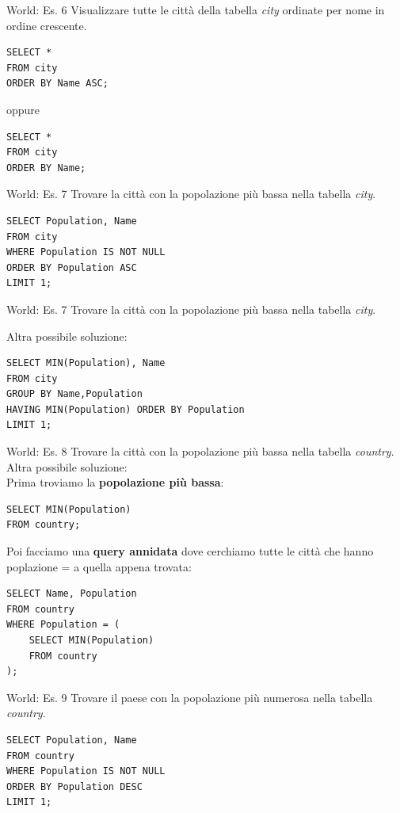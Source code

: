 %
\begin{frame}[fragile]{World: Es. 6}
Visualizzare tutte le citt\`a della tabella \textit{city} ordinate per nome in ordine crescente.
\pause
\begin{lstlisting}
SELECT *
FROM city
ORDER BY Name ASC;
\end{lstlisting}
oppure
\pause
\begin{lstlisting}
SELECT *
FROM city
ORDER BY Name;
\end{lstlisting}
\end{frame}
%
\begin{frame}[fragile]{World: Es. 7}
Trovare la citt\`a con la popolazione pi\`u bassa nella tabella \textit{city}.
\pause
\vspace{-.1cm}
\begin{lstlisting}
SELECT Population, Name
FROM city
WHERE Population IS NOT NULL
ORDER BY Population ASC
LIMIT 1;
\end{lstlisting}
\end{frame}
%
\begin{frame}[fragile]{World: Es. 7}
Trovare la citt\`a con la popolazione pi\`u bassa nella tabella \textit{city}.

Altra possibile soluzione:
\vspace{-.1cm}
\begin{lstlisting}
SELECT MIN(Population), Name
FROM city
GROUP BY Name,Population
HAVING MIN(Population) ORDER BY Population
LIMIT 1;
\end{lstlisting}
\end{frame}
%
\begin{frame}[fragile]{World: Es. 8}
Trovare la citt\`a con la popolazione pi\`u bassa nella tabella \textit{country}.
\\Altra possibile soluzione:
\pause
\\Prima troviamo la \textbf{popolazione pi\`u bassa}:
\begin{lstlisting}
SELECT MIN(Population)
FROM country;
\end{lstlisting}
\pause
Poi facciamo una \textbf{query annidata} dove cerchiamo tutte le citt\`a che hanno poplazione = a quella appena trovata:
\begin{lstlisting}
SELECT Name, Population
FROM country
WHERE Population = (
    SELECT MIN(Population)
    FROM country
);
\end{lstlisting}
\end{frame}
%
\begin{frame}[fragile]{World: Es. 9}
Trovare il paese con la popolazione pi\`u numerosa nella tabella \textit{country}.
\pause
\begin{lstlisting}
SELECT Population, Name
FROM country
WHERE Population IS NOT NULL
ORDER BY Population DESC
LIMIT 1;
\end{lstlisting}
\end{frame}
